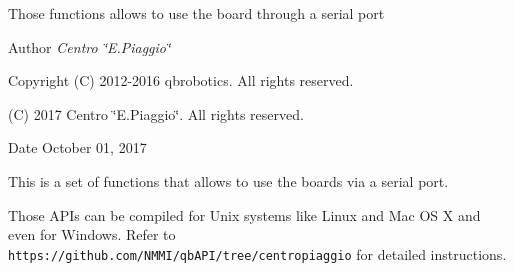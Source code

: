 Those functions allows to use the board through a serial port\begin{DoxyAuthor}{Author}
{\itshape Centro \char`\"{}\+E.\+Piaggio\char`\"{}} 
\end{DoxyAuthor}
\begin{DoxyCopyright}{Copyright}
(C) 2012-\/2016 qbrobotics. All rights reserved. 

(C) 2017 Centro \char`\"{}\+E.\+Piaggio\char`\"{}. All rights reserved.
\end{DoxyCopyright}
\begin{DoxyDate}{Date}
October 01, 2017
\end{DoxyDate}
This is a set of functions that allows to use the boards via a serial port.

Those A\+P\+Is can be compiled for Unix systems like Linux and Mac OS X and even for Windows. Refer to {\tt https\+://github.\+com/\+N\+M\+M\+I/qb\+A\+P\+I/tree/centropiaggio} for detailed instructions. 